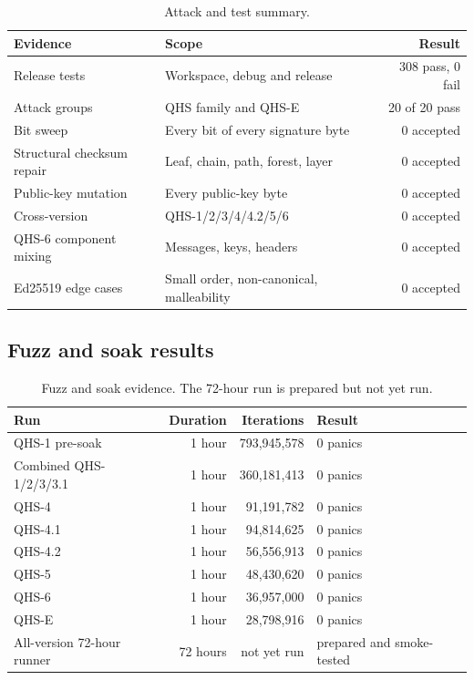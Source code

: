 \documentclass[11pt,a4paper]{article}
\begin{document}
\begin{table}[ht]
\centering
\caption{Attack and test summary.}
\label{tab:attacks}
\small
\begin{tabularx}{\textwidth}{@{}l Y r@{}}
\toprule
Evidence & Scope & Result\\
\midrule
Release tests & Workspace, debug and release & 308 pass, 0 fail\\
Attack groups & QHS family and QHS-E & 20 of 20 pass\\
Bit sweep & Every bit of every signature byte & 0 accepted\\
Structural checksum repair & Leaf, chain, path, forest, layer & 0 accepted\\
Public-key mutation & Every public-key byte & 0 accepted\\
Cross-version & QHS-1/2/3/4/4.2/5/6 & 0 accepted\\
QHS-6 component mixing & Messages, keys, headers & 0 accepted\\
Ed25519 edge cases & Small order, non-canonical, malleability & 0 accepted\\
\bottomrule
\end{tabularx}
\end{table}
\FloatBarrier

\subsection{Fuzz and soak results}

\begin{table}[ht]
\centering
\caption{Fuzz and soak evidence. The 72-hour run is prepared but not yet run.}
\label{tab:soak}
\small
\begin{tabularx}{\textwidth}{@{}l r r Y@{}}
\toprule
Run & Duration & Iterations & Result\\
\midrule
QHS-1 pre-soak & 1 hour & 793,945,578 & 0 panics\\
Combined QHS-1/2/3/3.1 & 1 hour & 360,181,413 & 0 panics\\
QHS-4 & 1 hour & 91,191,782 & 0 panics\\
QHS-4.1 & 1 hour & 94,814,625 & 0 panics\\
QHS-4.2 & 1 hour & 56,556,913 & 0 panics\\
QHS-5 & 1 hour & 48,430,620 & 0 panics\\
QHS-6 & 1 hour & 36,957,000 & 0 panics\\
QHS-E & 1 hour & 28,798,916 & 0 panics\\
All-version 72-hour runner & 72 hours & not yet run & prepared and smoke-tested\\
\bottomrule
\end{tabularx}
\end{table}
\FloatBarrier
\end{document}
